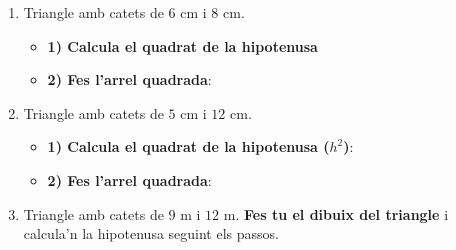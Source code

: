 \documentclass[12pt,a4paper]{article}
\begin{document}
\begin{enumerate}
    \item Triangle amb catets de $6\text{ cm}$ i $8\text{ cm}$.

    \begin{minipage}{0.4\textwidth}
        \begin{center}
        \end{center}
    \end{minipage}
    \begin{minipage}{0.55\textwidth}
        \begin{itemize}
            \item \textbf{1) Calcula el quadrat de la hipotenusa }\\ 
            \vspace{0.8cm}
            \item \textbf{2) Fes l'arrel quadrada}: \\
            \vspace{0.8cm}
        \end{itemize}
    \end{minipage}
    
    \item Triangle amb catets de $5\text{ cm}$ i $12\text{ cm}$.

    \begin{minipage}{0.4\textwidth}
        \begin{center}
        \end{center}
    \end{minipage}
    \begin{minipage}{0.55\textwidth}
        \begin{itemize}
            \item \textbf{1) Calcula el quadrat de la hipotenusa ($h^2$)}: \\
            \vspace{0.8cm}
            \item \textbf{2) Fes l'arrel quadrada}: \\
            \vspace{0.8cm}
        \end{itemize}
    \end{minipage}
    \newpage 
    \item Triangle amb catets de $9\text{ m}$ i $12\text{ m}$. \textbf{Fes tu el dibuix del triangle} i calcula'n la hipotenusa seguint els passos.
    \vspace{4.5cm}


\end{enumerate}
\end{document}
